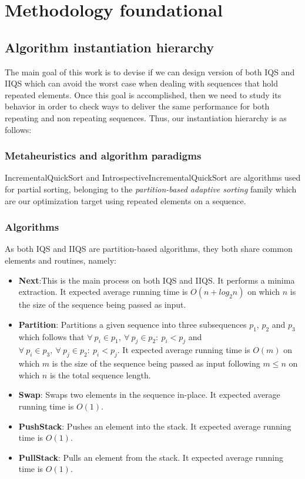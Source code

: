 \section{Methodology foundational}
\label{SECTION:METHODOLOGY_FOUNDATIONALS}

\subsection{Algorithm instantiation hierarchy}
The main goal of this work is to devise if we can design version of both IQS and IIQS which can avoid the worst case when dealing with sequences that hold repeated elements. Once this goal is accomplished, then we need to study its behavior in order to check ways to deliver the same performance for both repeating and non repeating sequences. Thus, our instantiation hierarchy is as follows:\\

\subsubsection{Metaheuristics and algorithm paradigms}
IncrementalQuickSort and IntrospectiveIncrementalQuickSort are algorithms used for partial sorting, belonging to the \textit{partition-based adaptive sorting} family which are our optimization target using repeated elements on a sequence.\\

\subsubsection{Algorithms}
As both IQS and IIQS are partition-based algorithms, they both share common elements and routines, namely:\\

\begin{itemize}
    \item \textbf{Next}:This is the main process on both IQS and IIQS. It performs a minima extraction. It expected average running time is $O(n + log_2{n})$ on which $n$ is the size of the sequence being passed as input.
    \item \textbf{Partition}: Partitions a given sequence into three subsequences $p_1$, $p_2$ and $p_3$ which follows that $\forall~p_i \in p_1,~\forall~p_j \in p_2:~ p_i < p_j$ and $\forall~p_i \in p_3,~\forall~p_j \in p_2:~p_i < p_j$. It expected average running time is $O(m)$ on which $m$ is the size of the sequence being passed as input following $m \leq n$ on which $n$ is the total sequence length.
    \item \textbf{Swap}: Swaps two elements in the sequence in-place. It expected average running time is $O(1)$.
    \item \textbf{PushStack}: Pushes an element into the stack. It expected average running time is $O(1)$.
    \item \textbf{PullStack}: Pulls an element from the stack. It expected average running time is $O(1)$.
\end{itemize}

